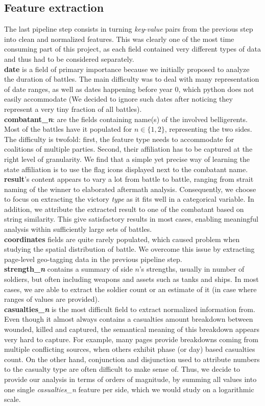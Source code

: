 \subsection{Feature extraction}
The last pipeline step consists in turning \textit{key}-\textit{value} pairs from the previous step into clean and normalized features. This was clearly one of the most time consuming part of this project, as each field contained very different types of data and thus had to be considered separately. \\
\textbf{date} is a field of primary importance because we initially proposed to analyze the duration of battles. The main difficulty was to deal with many representation of date ranges, as well as dates happening before year 0, which python does not easily accommodate (We decided to ignore such dates after noticing they represent a very tiny fraction of all battles).\\
\textbf{combatant\_\textit{n}}: are the fields containing name(s) of the involved belligerents. Most of the battles have it populated for $n \in \{1, 2\}$, representing the two sides. The difficulty is twofold: first, the feature type needs to accommodate for coalitions of multiple parties. Second, their affiliation has to be captured at the right level of granularity. We find that a simple yet precise way of learning the state affiliation is to use the flag icons displayed next to the combatant name.\\
\textbf{result}'s content appears to vary a lot from battle to battle, ranging from strait naming of the winner to elaborated aftermath analysis. Consequently, we choose to focus on extracting the victory \textit{type} as it fits well in a categorical variable. In addition, we attribute the extracted result to one of the combatant based on string similarity. This give satisfactory results in most cases, enabling meaningful analysis within sufficiently large sets of battles.\\
\textbf{coordinates} fields are quite rarely populated, which caused problem when studying the spatial distribution of battle. We overcome this issue by extracting page-level geo-tagging data in the previous pipeline step.\\
\textbf{strength\_\textit{n}} contains a summary of side $n$'s strengths, usually in number of soldiers, but often including weapons and assets such as tanks and ships. In most cases, we are able to extract the soldier count or an estimate of it (in case where ranges of values are provided).\\
\textbf{casualties\_\textit{n}} is the most difficult field to extract normalized information from. Even though  it almost always contains a casualties amount breakdown between wounded, killed and captured, the semantical meaning of this breakdown appears very hard to capture. For example, many pages provide breakdowns coming from multiple conflicting sources, when others exhibit phase (or day) based casualties count. On the other hand, conjunction and disjunction used to attribute numbers to the casualty type are often difficult to make sense of. Thus, we decide to provide our analysis in terms of orders of magnitude, by summing all values into one single \textit{casualties\_\textit{n}} feature per side, which we would study on a logarithmic scale.